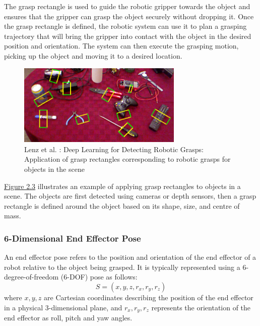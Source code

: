 \documentclass[11pt, a4paper]{report}
\begin{document}
The grasp rectangle is used to guide the robotic gripper towards the object and ensures that the gripper can grasp the object securely without dropping it. Once the grasp rectangle is defined, the robotic system can use it to plan a grasping trajectory that will bring the gripper into contact with the object in the desired position and orientation. The system can then execute the grasping motion, picking up the object and moving it to a desired location.
\begin{figure}[H]
    \centering
    \includegraphics[width=0.7\textwidth]{docs/Project Report/Media/2_1_2_grasp_rectangle_application.png}
    \caption{Lenz et al. \cite{lenz2014deep}: Deep Learning for Detecting Robotic Grasps: Application of grasp rectangles corresponding to robotic grasps for objects in the scene}
    \label{fig:2.3}
\end{figure}
\hyperref[fig:2.3]{Figure 2.3} illustrates an example of applying grasp rectangles to objects in a scene. The objects are first detected using cameras or depth sensors, then a grasp rectangle is defined around the object based on its shape, size, and centre of mass.

\subsubsection{6-Dimensional End Effector Pose}\label{sec:2.1.2.2}
An end effector pose refers to the position and orientation of the end effector of a robot relative to the object being grasped. It is typically represented using a 6-degree-of-freedom (6-DOF) pose as follows:
\begin{equation}
    S=(x,y,z,r_x,r_y,r_z)
\end{equation}
where $x,y,z$ are Cartesian coordinates describing the position of the end effector in a physical 3-dimensional plane, and $r_x,r_y,r_z$ represents the orientation of the end effector as roll, pitch and yaw angles.
\end{document}
